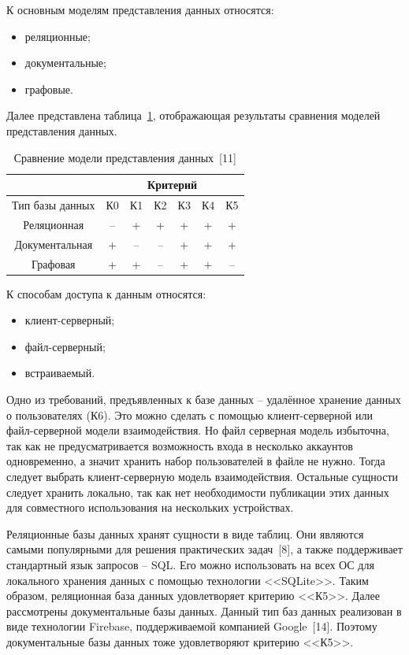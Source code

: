 К основным моделям представления данных относятся:
\begin{itemize}
    \item реляционные;
    \item документальные;
    \item графовые.
\end{itemize}

Далее представлена таблица~\ref{table:cmp_model}, отображающая результаты сравнения моделей представления данных.
\begin{table}[h!]
    \centering
    \begin{tabular} { |c|c|c|c|c|c|c| }
        \hline
        \hspace{0pt} & \multicolumn{6}{|c|}{Критерий} \\
        \hline
        Тип базы данных & К0 & К1 & К2 & К3 & К4 & К5 \\
        \hline
        Реляционная & -- & + & + & + & + & + \\
        \hline
        Документальная & + & -- & -- & + & + & + \\
        \hline
        Графовая & + & + & -- & + & + & -- \\
        \hline
        \end{tabular}
    \caption{\centering Сравнение модели представления данных~[11]}
    \label{table:cmp_model}
\end{table}

К способам доступа к данным относятся:
\begin{itemize}
    \item клиент-серверный;
    \item файл-серверный;
    \item встраиваемый.
\end{itemize}

Одно из требований, предъявленных к базе данных -- удалённое хранение данных о пользователях (К6).
Это можно сделать с помощью клиент-серверной или файл-серверной модели взаимодействия.
Но файл серверная модель избыточна, так как не предусматривается возможность входа в несколько аккаунтов одновременно, а значит хранить набор пользователей в файле не нужно.
Тогда следует выбрать клиент-серверную модель взаимодействия.
Остальные сущности следует хранить локально, так как нет необходимости публикации этих данных для совместного использования на нескольких устройствах.

Реляционные базы данных хранят сущности в виде таблиц.
Они являются самыми популярными для решения практических задач~[8], а также поддерживает стандартный язык запросов -- SQL. Его можно использовать на всех ОС для локального хранения данных с помощью технологии <<SQLite>>.
Таким образом, реляционная база данных удовлетворяет критерию <<К5>>.
Далее рассмотрены документальные базы данных.
Данный тип баз данных реализован в виде технологии Firebase, поддерживаемой компанией Google~[14].
Поэтому документальные базы данных тоже удовлетворяют критерию <<К5>>.

